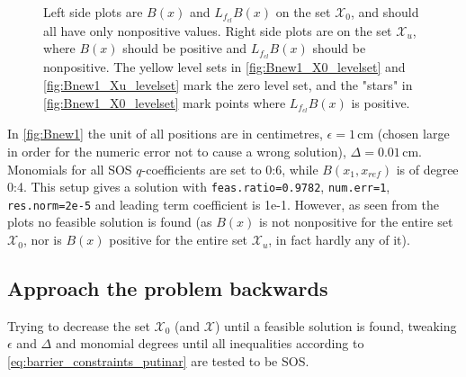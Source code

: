 \begin{figure}[H]
\vspace*{-5mm}
%
%
\hspace{1mm}
%
%
\hspace{1mm}
%
%
\caption{Left side plots are $B(x)$ and $L_{f_{cl}}B(x)$ on the set $\mathcal{X}_0$, and should all have only nonpositive values. Right side plots are on the set $\mathcal{X}_u$, where $B(x)$ should be positive and $L_{f_{cl}}B(x)$ should be nonpositive. The yellow level sets in \autoref{fig:Bnew1_X0_levelset} and \ref{fig:Bnew1_Xu_levelset} mark the zero level set, and the "stars" in \autoref{fig:Bnew1_X0_levelset} mark points where $L_{f_{cl}}B(x)$ is positive.}
\label{fig:Bnew1}
\end{figure}

In \autoref{fig:Bnew1} the unit of all positions are in centimetres, $\epsilon=1$\,cm (chosen large in order for the numeric error not to cause a wrong solution), $\Delta=0.01$\,cm. Monomials for all SOS $q$-coefficients are set to 0:6, while $B(x_1,x_{ref})$ is of degree 0:4. This setup gives a solution with \texttt{feas.ratio=0.9782}, \texttt{num.err=1}, \texttt{res.norm=2e-5} and leading term coefficient is 1e-1. However, as seen from the plots no feasible solution is found (as $B(x)$ is not nonpositive for the entire set $\mathcal{X}_0$, nor is $B(x)$ positive for the entire set $\mathcal{X}_u$, in fact hardly any of it).

\subsection{Approach the problem backwards}
Trying to decrease the set $\mathcal{X}_0$ (and $\mathcal{X}$) until a feasible solution is found, tweaking $\epsilon$ and $\Delta$ and monomial degrees until all inequalities according to \autoref{eq:barrier_constraints_putinar} are tested to be SOS.

